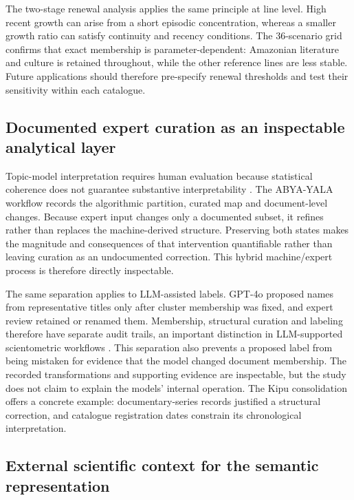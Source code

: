 \documentclass[futureinternet,article,submit,moreauthors]{Definitions/mdpi}
\newcommand{\ABYA}{ABYA-YALA\xspace}
\begin{document}
The two-stage renewal analysis applies the same principle at line level. High recent growth can arise from a short episodic concentration, whereas a smaller growth ratio can satisfy continuity and recency conditions. The 36-scenario grid confirms that exact membership is parameter-dependent: Amazonian literature and culture is retained throughout, while the other reference lines are less stable. Future applications should therefore pre-specify renewal thresholds and test their sensitivity within each catalogue.

\subsection{Documented expert curation as an inspectable analytical layer}

Topic-model interpretation requires human evaluation because statistical coherence does not guarantee substantive interpretability \citep{chang2009tea,mimno2011coherence}. The \ABYA workflow records the algorithmic partition, curated map and document-level changes. Because expert input changes only a documented subset, it refines rather than replaces the machine-derived structure. Preserving both states makes the magnitude and consequences of that intervention quantifiable rather than leaving curation as an undocumented correction. This hybrid machine/expert process is therefore directly inspectable.

The same separation applies to LLM-assisted labels. GPT-4o proposed names from representative titles only after cluster membership was fixed, and expert review retained or renamed them. Membership, structural curation and labeling therefore have separate audit trails, an important distinction in LLM-supported scientometric workflows \citep{lee2026evidence}. This separation also prevents a proposed label from being mistaken for evidence that the model changed document membership. The recorded transformations and supporting evidence are inspectable, but the study does not claim to explain the models' internal operation. The Kipu consolidation offers a concrete example: documentary-series records justified a structural correction, and catalogue registration dates constrain its chronological interpretation.

\subsection{External scientific context for the semantic representation}
\end{document}
